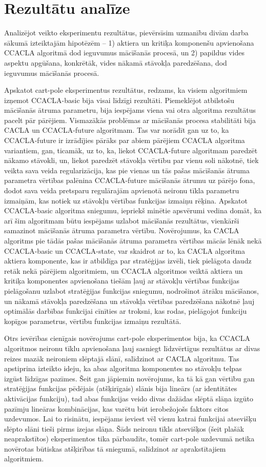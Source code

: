 \documentclass{ludis} %
\begin{document}
\section{Rezultātu analīze}
Analizējot veikto eksperimentu rezultātus, pievērsīsim uzmanību divām darba
sākumā izteiktajām hipotēzēm -- 1) aktiera un kritiķa komponenšu apvienošana
CCACLA algoritmā dod ieguvumus mācīšanās procesā, un 2) papildus vides aspektu
apgūšana, konkrētāk, vides nākamā stāvokļa paredzēšana, dod ieguvumus mācīšanās
procesā.

Apskatot cart-pole eksperimentus rezultātus, redzams, ka visiem algoritmiem
izņemot CCACLA-basic bija visai līdzīgi rezultāti. Piemeklējot atbilstošu
mācīšanās ātruma parametru, bija iespējams viena vai otra algoritma rezultātus
pacelt pār pārējiem. Vismazākās problēmas ar mācīšanās procesa stabilitāti bija
CACLA un CCACLA-future algoritmam. Tas var norādīt gan uz to, ka CCACLA-future
ir izrādījies pārāks par abiem pārējiem CCACLA algoritma variantiem, gan,
ticamāk, uz to, ka, liekot CCACLA-future algoritmam paredzēt nākamo stāvokli, un,
liekot paredzēt stāvokļa vērtību par vienu soli nākotnē, tiek veikta sava veida
regularizācija, kas pie vienas un tās pašas mācīšanās ātruma parametra vērtības
palēnina CCACLA-future mācīšanās ātrumu uz pārējo fona, dodot sava veida
pretsparu regulārajām apvienotā neironu tīkla parametru izmaiņām, kas notiek uz
stāvokļu vērtības funkcijas izmaiņu rēķina. Apskatot CCACLA-basic algoritma
sniegumu, iepriekš minētie apsvērumi vedina domāt, ka arī šim algoritmam būtu
iespējams uzlabot mācīšanās rezultātus, vienkārši samazinot mācīšanās ātruma
parametra vērtību. Novērojumus, ka CACLA algoritms pie tādās pašas mācīšanās
ātruma parametra vērtības mācās lēnāk nekā CCACLA-basic un CCACLA-state, var
skaidrot ar to, ka CACLA algoritma aktiera komponente, kas ir atbildīga par
stratēģijas izvēli, tiek pielāgota daudz retāk nekā pārējiem algoritmiem, un
CCACLA algoritmos veiktā aktiera un kritiķa komponentes apvienošana tiešām ļauj
ar stāvokļu vērtības funkcijas pielāgošanu uzlabot stratēģijas funkcijas
sniegumu, nodrošinot ātrāku mācīšanos, un nākamā stāvokļa paredzēšana un
stāvokļa vērtības paredzēšana nākotnē ļauj optimālās darbības funkcijai cīnīties
ar troksni, kas rodas, pielāgojot funkciju kopīgos parametrus, vērtību funkcijas
izmaiņu rezultātā.

Otrs ievērības cienīgais novērojums cart-pole eksperimentos bija, ka CCACLA
algoritmos neironu tīklu apvienošana ļauj sasniegt līdzvērtīgus rezultātus ar
divas reizes mazāk neironiem slēptajā slānī, salīdzinot ar CACLA algoritmu. Tas
apstiprina izteikto ideju, ka abas algoritma komponentes no stāvokļu telpas
izgūst līdzīgas pazīmes. Šeit gan jāpiemin novērojums, ka tā kā gan vērtību gan
stratēģijas funkcijas pēdējais (atšķirīgais) slānis bija lineārs (ar identitātes
aktivācijas funkciju), tad abas funkcijas veido divas dažādas slēptā slāņa
izgūto pazīmju lineāras kombinācijas, kas varētu būt ierobežojošs faktors citos
uzdevumos. Lai to risinātu, iespējams ieviest vēl vienu katrai funkcijai
atsevišķu slēpto slāni tieši pirms izejas slāņa. Šāds neironu tīkls atsevišķos
(šeit plašāk neaprakstītos) eksperimentos tika pārbaudīts, tomēr cart-pole
uzdevumā netika novērotas būtiskas atšķirības tā sniegumā, salīdzinot ar
aprakstītajiem algoritmiem.
\end{document}
